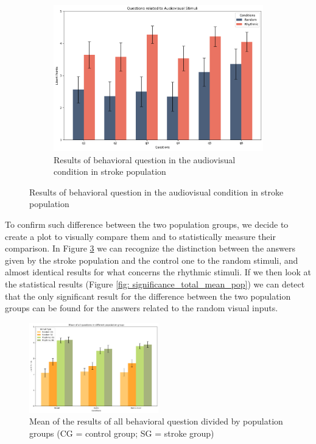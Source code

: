 \begin{figure}[htbp]
\begin{subfigure}[b]{0.5\textwidth}
        \centering
        \includegraphics[width=\textwidth]{bar_plots/plotbar_audiovisual_s.png}
        \caption{Results of behavioral question in the audiovisual condition in stroke population}
        \label{fig: bar_audiovisual_stroke} 
    \end{subfigure} 
\end{figure}

To confirm such difference between the two population groups, we decide to create a plot to visually compare them and to statistically measure their comparison. In Figure \ref{fig: mean_population_condition} we can recognize the distinction between the answers given by the stroke population and the control one to the random stimuli, and almost identical results for what concerns the rhythmic stimuli. If we then look at the statistical results (Figure \ref{fig: significance_total_mean_pop}) we can detect that the only significant result for the difference between the two population groups can be found for the answers related to the random visual inputs. 
\begin{figure}[htbp]
    \centering
    \includegraphics[width=0.5\textwidth]{bar_plots/mean stroke and control.png}
    \caption{Mean of the results of all behavioral question divided by population groups (CG = control group; SG = stroke group)}
    \label{fig: mean_population_condition} 
\end{figure} 

